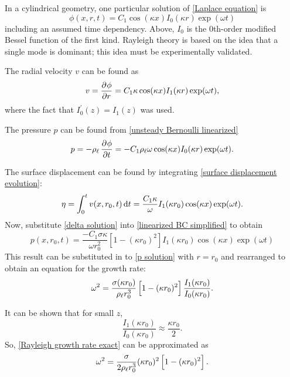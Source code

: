 In a cylindrical geometry, one particular solution of \eqref{Laplace equation} is
\begin{equation}
   \phi(x, r, t) = C_1 \cos(\kappa x) I_0(\kappa r) \exp(\omega t)
\end{equation}
including an assumed time dependency. Above, $I_0$ is the $0$th-order modified Bessel function of the first kind. Rayleigh theory is based on the idea that a single mode is dominant; this idea must be experimentally validated.

The radial velocity $v$ can be found as
\begin{equation}
   v = \dpd{\phi}{r} = C_1 \kappa \cos(\kappa x) I_1(\kappa r) \exp(\omega t),
\end{equation}
where the fact that $I_0^\prime(z) = I_1(z)$ was used.

The pressure $p$ can be found from \eqref{unsteady Bernoulli linearized}
\begin{equation}
   p = -\rhol \dpd{\phi}{t} = -C_1 \rhol \omega \cos(\kappa x) I_0(\kappa r) \exp(\omega t). \label{eqn:p solution}
\end{equation}

The surface displacement can be found by integrating \eqref{surface displacement evolution}:
\begin{equation}
   \eta = \int_0^t v(x, r_0, t) \dif t = \frac{C_1 \kappa}{\omega} I_1(\kappa r_0) \cos(\kappa x) \exp(\omega t). \label{eqn:delta solution}
\end{equation}
Now, substitute \eqref{delta solution} into \eqref{linearized BC simplified} to obtain
\begin{equation}
   p(x, r_0, t) = \frac{-C_1 \sigma \kappa}{\omega r_0^2} \left[1 - (\kappa r_0)^2\right] I_1(\kappa r_0) \cos(\kappa x) \exp(\omega t)
\end{equation}
This result can be substituted in to \eqref{p solution} with $r = r_0$ and rearranged to obtain an equation for the growth rate:
\begin{equation}
   \omega^2 = \frac{\sigma (\kappa r_0)}{\rho_{\ell} r_0^3} \left[1 - (\kappa r_0)^2\right] \frac{I_1(\kappa r_0)}{I_0(\kappa r_0)}. \label{eqn:Rayleigh growth rate exact}
\end{equation}

It can be shown that for small $z$,
\begin{equation}
   \frac{I_1(\kappa r_0)}{I_0(\kappa r_0)} \approx \frac{\kappa r_0}{2}.
\end{equation}
So, \eqref{Rayleigh growth rate exact} can be approximated as
\begin{equation}
   \omega^2 = \frac{\sigma}{2 \rho_{\ell} r_0^3} (\kappa r_0)^2 \left[1 - (\kappa r_0)^2\right]. \label{eqn:Rayleigh growth rate approx}
\end{equation}

